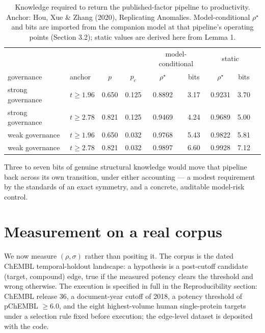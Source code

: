 \documentclass[11pt]{article}
\begin{document}
\begin{table}[t]
\centering
\footnotesize
\caption{Knowledge required to return the published-factor pipeline to
productivity. Anchor: Hou, Xue \& Zhang (2020), Replicating Anomalies.
Model-conditional $\rho^\star$ and bits are imported from the companion
model at that pipeline's operating points (Section 3.2); static values are
derived here from Lemma 1.}
\begin{tabular}{llccccccc}
\toprule
& & & & \multicolumn{2}{c}{model-conditional} &
\multicolumn{2}{c}{static} \\
governance & anchor & $p$ & $p_c$ & $\rho^\star$ & bits &
$\rho^\star$ & bits \\
\midrule
strong governance & $t \geq 1.96$ & 0.650 & 0.125 & 0.8892 & 3.17 & 0.9231 & 3.70 \\
strong governance & $t \geq 2.78$ & 0.821 & 0.125 & 0.9469 & 4.24 & 0.9689 & 5.00 \\
weak governance & $t \geq 1.96$ & 0.650 & 0.032 & 0.9768 & 5.43 & 0.9822 & 5.81 \\
weak governance & $t \geq 2.78$ & 0.821 & 0.032 & 0.9897 & 6.60 & 0.9928 & 7.12 \\
\bottomrule
\end{tabular}
\end{table}

Three to seven bits of genuine structural knowledge would move that pipeline
back across its own transition, under either accounting --- a modest
requirement by the standards of an exact symmetry, and a concrete, auditable
model-risk control.

\section{Measurement on a real corpus}

We now measure $(\rho, \sigma)$ rather than positing it. The corpus is the
dated ChEMBL \cite{mendez} temporal-holdout landscape: a hypothesis is a
post-cutoff candidate (target, compound) edge, true if the measured potency
clears the threshold and wrong otherwise. The execution is specified
in full in the Reproducibility section: ChEMBL release 36, a
document-year cutoff of 2018, a potency threshold of pChEMBL
$\geq 6.0$, and the eight highest-volume human single-protein targets
under a selection rule fixed before execution; the edge-level dataset
is deposited with the code.
\end{document}
